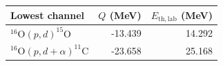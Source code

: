 \begin{tabular}{lrr}
\toprule
Lowest channel & $Q$ (MeV) & $E_{\mathrm{th,lab}}$ (MeV) \\
\midrule
$^{16}\mathrm{O}(p,d)^{15}\mathrm{O}$ & -13.439 & 14.292 \\
$^{16}\mathrm{O}(p,d+\alpha)^{11}\mathrm{C}$ & -23.658 & 25.168 \\
\bottomrule
\end{tabular}
